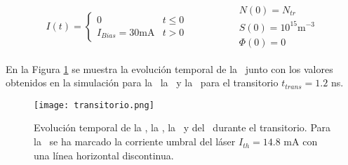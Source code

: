 				\begin{equation}
					\begin{matrix}
							I(t) = \left\{\begin{matrix}
											0 & t \leq 0\\ 
											I_{Bias} = 30 \textrm{mA} & t > 0
									\end{matrix}\right.
							& & & & & & 
							\begin{matrix}
								N(0) = N_{tr} \\ S(0) = 10^{15} \textrm{m}^{-3}\\ \Phi(0) = 0
							\end{matrix}
						\end{matrix}
					\label{eq:transient}
				\end{equation}

			En la Figura \ref{Img:transitorio} se muestra la evoluci\'on temporal de la \I\ junto con los valores obtenidos en la simulaci\'on para la \n\, la \s\ y la \fase\ para el transitorio $t_{trans} = 1.2$ ns.

				\begin{figure}[H]
					\centering
					\texttt{[image: transitorio.png]}
					\caption{\label{Img:transitorio}Evoluci\'on temporal de la \I, la \s, la \n\ y del \chirp\ durante el transitorio. Para la \I\ se ha marcado la corriente umbral del l\'aser $I_{th} = 14.8$ mA con una l\'inea horizontal discontinua.}	
				\end{figure}
				
